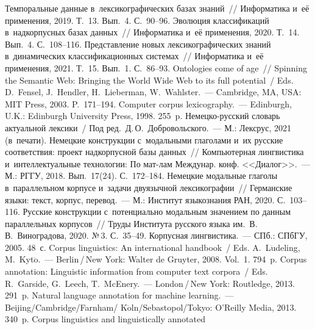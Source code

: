 \begin{multicols}{2}
{{\begin{thebibliography}{99}
 Темпоральные данные 
в~лексикографических базах знаний~// Информатика и~её применения, 2019. Т.~13. 
Вып.~4. С.~90--96.
 Эволюция классификаций 
в~надкорпусных базах данных~// Информатика и~её применения, 2020. Т.~14. 
Вып.~4. С.~108--116.
 Пред\-став\-ле\-ние новых 
лексикографических знаний в~динамических классификационных сис\-те\-мах~// 
Информатика и~её применения, 2021. Т.~15. Вып.~1. 
С.~86--93.
 Ontologies come of age~// Spinning the Semantic Web: Bringing the 
World Wide Web to its full potential~/ Eds. D.~Fensel, J.~Hendler, H.~Lieberman, 
W.~Wahlster.~--- Cambridge, MA, USA: MIT Press, 2003. P.~171--194.
 Computer corpus lexicography.~--- Edinburgh, U.K.: Edinburgh University 
Press, 1998. 255~p.
Немецко-русский словарь актуальной лексики~/ Под ред.\ Д.\,О.~Добровольского.~--- 
М.: Лексрус, 2021 (в~печати).
 Немецкие конструкции с~модальными 
глаголами и~их русские соответствия: проект надкорпусной базы данных~// 
Компьютерная лингвистика и~интеллектуальные \mbox{технологии}: По мат-лам Междунар. 
конф. <<Диалог>>.~--- М.: РГГУ, 2018. Вып.~17(24). С.~172--184.
 Немецкие модальные глаголы в~параллельном корпусе 
и~задачи двуязычной лексикографии~// Германские языки: текст, корпус, перевод.~--- 
М.: Институт языкознания РАН, 2020. С.~103--116.
 Русские конструкции с~потенциально 
модальным значением по данным параллельных корпусов~// Труды Института 
русского языка им.\ В.\,В.~Виноградова, 2020. №\,3. С.~35--49.
 Корпусная лингвистика.~--- СПб.: \mbox{СПбГУ}, 2005. 48~с.
Corpus linguistics: An international handbook~/
Eds. A.~L$\ddot{\mbox{u}}$deling, M.~Kyt$\ddot{\mbox{o}}$.~--- Berlin\,/\,New York: 
Walter de Gruyter, 2008. Vol.~1. 794~p.
Corpus annotation: Linguistic information from computer text corpora~/
Eds. R.~Garside, G.~Leech, T.~McEnery.~--- London\,/\,New York: Routledge, 2013. 291~p.
 Natural language annotation for machine learning.~--- 
Beijing/Cambridge/Farnham/ K$\ddot{\mbox{o}}$ln/Sebastopol/Tokyo: 
O'Reilly Media, 2013. 340~p.
 Corpus linguistics and linguistically annotated 

\end{thebibliography}}}
\end{multicols}
